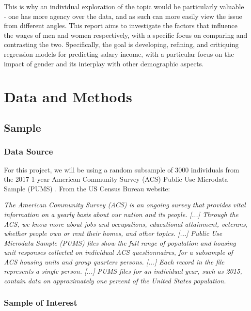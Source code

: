 \documentclass{article}
\begin{document}
This is why an individual exploration of the topic would be particularly valuable - one has more agency over the data, and as such can more easily view the issue from different angles. This report aims to investigate the factors that influence the wages of men and women respectively, with a specific focus on comparing and contrasting the two. Specifically, the goal is developing, refining, and critiquing regression models for predicting salary income, with a particular focus on the impact of gender and its interplay with other demographic aspects.

\section{Data and Methods}

\subsection{Sample}

\subsubsection{Data Source}

For this project, we will be using a random subsample of 3000 individuals from the 2017 1-year American Community Survey (ACS) Public Use Microdata Sample (PUMS) \cite{data}. From the US Census Bureau website:

\begin{singlespace}
    \begin{displayquote}
        \textit{The American Community Survey (ACS) is an ongoing survey that provides vital information on a yearly basis about our nation and its people. [...] Through the ACS, we know more about jobs and occupations, educational attainment, veterans, whether people own or rent their homes, and other topics. [...] Public Use Microdata Sample (PUMS) files show the full range of population and housing unit responses collected on individual ACS questionnaires, for a subsample of ACS housing units and group quarters persons. [...] Each record in the file represents a single person. [...] PUMS files for an individual year, such as 2015, contain data on approximately one percent of the United States population.} \cite{about}
    \end{displayquote}
\end{singlespace}

\subsubsection{Sample of Interest}
\end{document}
